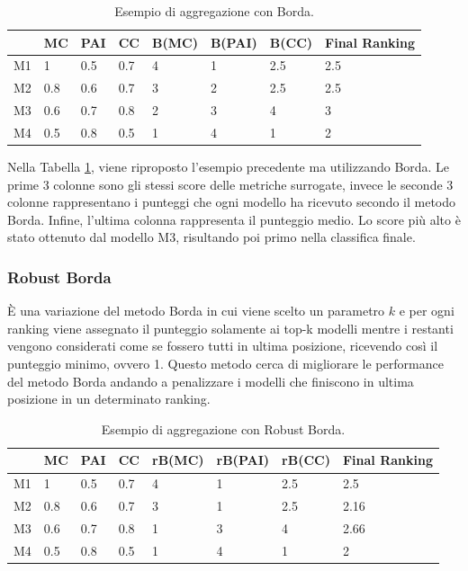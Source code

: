 \begin{table}
	
	\centering
	\begin{tabular}{|l|l|l|l|l|l|l|l|}
		\hline
		   & MC  & PAI & CC  & B(MC) & B(PAI) & B(CC) & Final Ranking \\ \hline
		M1 & 1   & 0.5 & 0.7 & 4     & 1      & 2.5   & 2.5           \\ \hline
		M2 & 0.8 & 0.6 & 0.7 & 3     & 2      & 2.5   & 2.5           \\ \hline
		M3 & 0.6 & 0.7 & 0.8 & 2     & 3      & 4     & 3             \\ \hline
		M4 & 0.5 & 0.8 & 0.5 & 1     & 4      & 1     & 2             \\ \hline
	\end{tabular}
	\caption{\label{borda}Esempio di aggregazione con Borda.}
\end{table}


Nella Tabella \ref{borda}, viene riproposto l'esempio precedente ma utilizzando Borda. Le prime 3 colonne sono gli stessi score delle metriche surrogate, invece le seconde 3 colonne rappresentano i punteggi che ogni modello ha ricevuto secondo il metodo Borda. Infine, l'ultima colonna rappresenta il punteggio medio. Lo score più alto è stato ottenuto dal modello M3, risultando poi primo nella classifica finale.
\subsubsection{Robust Borda}
È una variazione del metodo Borda in cui viene scelto un parametro $k$ e per ogni ranking viene assegnato il punteggio solamente ai top-k modelli mentre i restanti vengono considerati come se fossero tutti in ultima posizione, ricevendo così il punteggio minimo, ovvero 1. Questo metodo cerca di migliorare le performance del metodo Borda andando a penalizzare i modelli che finiscono in ultima posizione in un determinato ranking. 

\begin{table}
	
	\centering
	\begin{tabular}{|l|l|l|l|l|l|l|l|}
		\hline
		   & MC  & PAI & CC  & rB(MC) & rB(PAI) & rB(CC) & Final Ranking \\ \hline
		M1 & 1   & 0.5 & 0.7 & 4      & 1       & 2.5    & 2.5           \\ \hline
		M2 & 0.8 & 0.6 & 0.7 & 3      & 1       & 2.5    & 2.16          \\ \hline
		M3 & 0.6 & 0.7 & 0.8 & 1      & 3       & 4      & 2.66          \\ \hline
		M4 & 0.5 & 0.8 & 0.5 & 1      & 4       & 1      & 2             \\ \hline
	\end{tabular}
	\caption{\label{rborda}Esempio di aggregazione con Robust Borda.}
\end{table}

